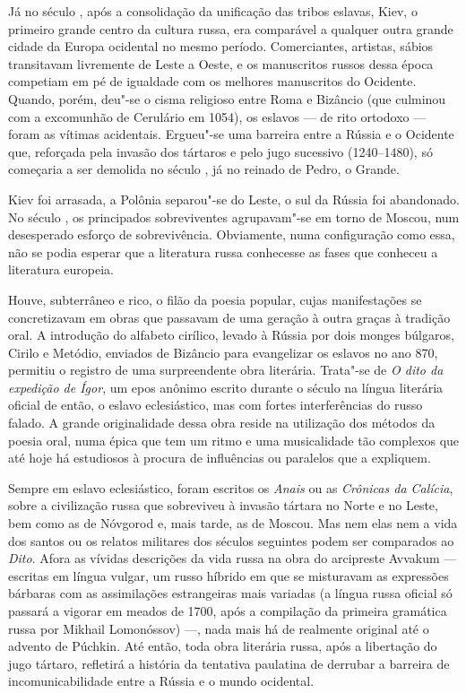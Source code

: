Já no século , após a consolidação da unificação das tribos eslavas,
Kiev, o primeiro grande centro da cultura russa, era comparável a
qualquer outra grande cidade da Europa ocidental no mesmo período.
Comerciantes, artistas, sábios transitavam livremente de Leste a Oeste,
e os manuscritos russos dessa época competiam em pé de igualdade com os
melhores manuscritos do Ocidente. Quando, porém, deu"-se o cisma
religioso entre Roma e Bizâncio (que culmi­nou com a excomunhão de
Cerulário em 1054), os eslavos --- de rito ortodoxo --- foram as vítimas
acidentais. Ergueu"-se uma barreira entre a Rússia e o Ociden­te que,
reforçada pela invasão dos tártaros e pelo jugo sucessivo (1240--1480),
só começaria a ser demolida no século , já no reinado de
Pedro, o Grande.

Kiev foi arrasada, a Polônia separou"-se do Leste, o sul da Rússia foi
abando­nado. No século , os principados sobreviventes agrupavam"-se em
torno de Moscou, num desesperado esforço de sobrevivência. Obviamente,
numa con­figuração como essa, não se podia esperar que a literatura
russa conhecesse as fases que conheceu a literatura europeia.

Houve, subterrâneo e rico, o filão da poesia popular, cujas
manifestações se concretizavam em obras que passavam de uma geração à
outra graças à tradi­ção oral. A introdução do alfabeto cirílico,
levado à Rússia por dois monges búlgaros, Cirilo e Metódio, enviados de
Bizâncio para evangelizar os eslavos no ano 870, permitiu o registro de
uma surpreendente obra literária. Trata"-se de \emph{O dito da expedição de
Ígor}, um epos anônimo escrito durante o século  na língua literária
oficial de então, o eslavo eclesiástico, mas com fortes interfe­rências
do russo falado. A grande originalidade dessa obra reside na utilização dos
métodos da poesia oral, numa épica que tem um ritmo e uma musicalidade
tão complexos que até hoje há estudiosos à procura de influências ou
paralelos que a expliquem.

Sempre em eslavo eclesiástico, foram escritos os \emph{Anais} ou as \emph{Crônicas da
Calícia}, sobre a civilização russa que sobreviveu à invasão tártara no Norte e
no Leste, bem como as de Nóvgorod e, mais tarde, as de Moscou. Mas nem
elas nem a vida dos santos ou os relatos militares dos séculos seguintes
podem ser comparados ao \emph{Dito}. Afora as vívidas descrições da vida russa
na obra do arcipreste Avvakum --- escritas em língua vulgar, um russo
híbrido em que se misturavam as expres­sões bárbaras com as assimilações
estrangeiras mais variadas (a língua russa oficial só passará a vigorar
em meados de 1700, após a compilação da primeira gramática russa por Mikhail Lomonóssov) ---, nada
mais há de realmente original até o advento de Púchkin. Até então, toda
obra literária russa, após a libertação do jugo tártaro, refletirá a
história da tentativa paulatina de derrubar a barreira de
incomunicabilidade entre a Rússia e o mundo ocidental.

